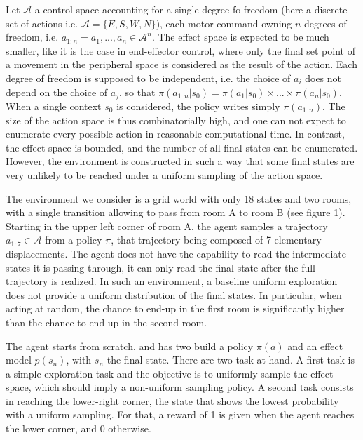 \documentclass[runningheads]{llncs}
\begin{document}
Let $\mathcal{A}$ a control space accounting for a single degree fo freedom (here a discrete set of actions i.e. $\mathcal{A}=\{E,S,W,N\}$), each motor command owning $n$ degrees of freedom, i.e. $a_{1:n} = {a_1,...,a_n} \in \mathcal{A}^n $. The effect space is expected to be much smaller, like it is the case in end-effector control, where only the final set point of a movement in the peripheral space is considered as the result of the action. Each degree of freedom is supposed to be independent, i.e. the choice of $a_i$ does not depend on the choice of $a_j$, so that $\pi(a_{1:n}|s_0) = \pi(a_1|s_0) \times ... \times \pi(a_n|s_0)$. When a single context $s_0$ is considered, the policy writes simply $\pi(a_{1:n})$.
The size of the action space is thus combinatorially high, and one can not expect to enumerate every possible action in reasonable computational time. 
In contrast, the effect space is bounded, and the number of all final states can be enumerated. However, the environment is constructed in such a way that some final states are very unlikely to be reached under a uniform sampling of the action space.


The environment we consider is a grid world with only 18 states and two rooms, with a single transition allowing to pass from room A to room B (see figure 1). %
Starting in the upper left corner of room A, the agent samples a trajectory $a_{1:7} \in \mathcal{A}$ from a policy $\pi$, that trajectory being composed of 7 elementary displacements. The agent does not have the capability to read the intermediate states it is passing through, it can only read the final state after the full trajectory is realized. 
In such an environment, a baseline uniform exploration does not provide a uniform distribution of the final states. In particular, when acting at random, the chance to end-up in the first room is significantly higher than the chance to end up in the second room.  
    
The agent starts from scratch, and has two build a policy $\pi(a)$ and an effect model $p(s_n)$, with $s_n$ the final state. 
There are two task at hand. A first task is a simple exploration task and the objective is to uniformly sample the effect space, which should imply a non-uniform sampling policy. A second task consists in reaching the lower-right corner, the state that shows the lowest probability with a uniform sampling. For that, a reward of 1 is given when the agent reaches the lower corner, and 0 otherwise.
\end{document}
